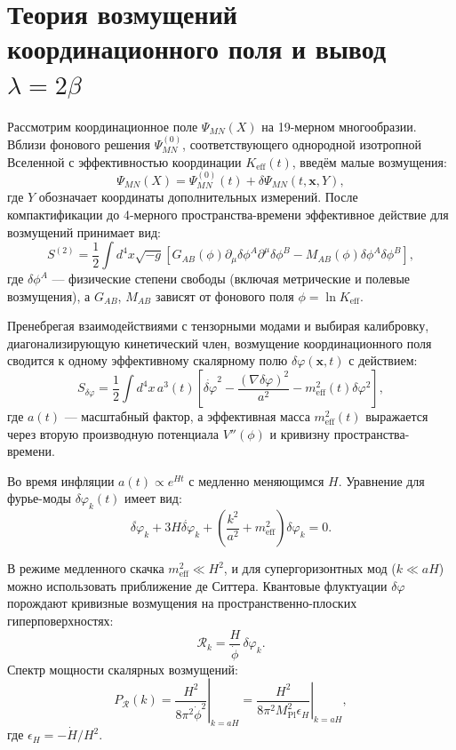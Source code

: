 \documentclass[12pt,a4paper]{article}
\theoremstyle{remark}
\newcommand{\Keff}{K_{\mathrm{eff}}}
\newcommand{\Mpl}{M_{\mathrm{Pl}}}
\begin{document}
	\appendix
	\section{Теория возмущений координационного поля и вывод $\lambda = 2\beta$}
	\label{app:perturbations}
	
	Рассмотрим координационное поле $\Psi_{MN}(X)$ на 19-мерном многообразии. Вблизи фонового решения $\Psi^{(0)}_{MN}$, соответствующего однородной изотропной Вселенной с эффективностью координации $\Keff(t)$, введём малые возмущения:
	\begin{equation}
		\Psi_{MN}(X) = \Psi^{(0)}_{MN}(t) + \delta\Psi_{MN}(t,\mathbf{x},Y),
	\end{equation}
	где $Y$ обозначает координаты дополнительных измерений. После компактификации до 4-мерного пространства-времени эффективное действие для возмущений принимает вид:
	\begin{equation}
		S^{(2)} = \frac{1}{2} \int d^4x \sqrt{-g} \left[ G_{AB}(\phi) \partial_\mu \delta\phi^A \partial^\mu \delta\phi^B - M_{AB}(\phi) \delta\phi^A \delta\phi^B \right],
	\end{equation}
	где $\delta\phi^A$ — физические степени свободы (включая метрические и полевые возмущения), а $G_{AB}$, $M_{AB}$ зависят от фонового поля $\phi = \ln\Keff$.
	
	Пренебрегая взаимодействиями с тензорными модами и выбирая калибровку, диагонализирующую кинетический член, возмущение координационного поля сводится к одному эффективному скалярному полю $\delta\varphi(\mathbf{x},t)$ с действием:
	\begin{equation}
		S_{\delta\varphi} = \frac{1}{2} \int d^4x \, a^3(t) \left[ \dot{\delta\varphi}^2 - \frac{(\nabla\delta\varphi)^2}{a^2} - m_{\mathrm{eff}}^2(t) \delta\varphi^2 \right],
	\end{equation}
	где $a(t)$ — масштабный фактор, а эффективная масса $m_{\mathrm{eff}}^2(t)$ выражается через вторую производную потенциала $V''(\phi)$ и кривизну пространства-времени.
	
	Во время инфляции $a(t) \propto e^{Ht}$ с медленно меняющимся $H$. Уравнение для фурье-моды $\delta\varphi_k(t)$ имеет вид:
	\begin{equation}
		\ddot{\delta\varphi}_k + 3H\dot{\delta\varphi}_k + \left( \frac{k^2}{a^2} + m_{\mathrm{eff}}^2 \right) \delta\varphi_k = 0.
	\end{equation}
	
	В режиме медленного скачка $m_{\mathrm{eff}}^2 \ll H^2$, и для супергоризонтных мод ($k \ll aH$) можно использовать приближение де Ситтера. Квантовые флуктуации $\delta\varphi$ порождают кривизные возмущения на пространственно-плоских гиперповерхностях:
	\begin{equation}
		\mathcal{R}_k = \frac{H}{\dot{\phi}} \, \delta\varphi_k.
	\end{equation}
	Спектр мощности скалярных возмущений:
	\begin{equation}
		P_{\mathcal{R}}(k) = \left. \frac{H^2}{8\pi^2 \dot{\phi}^2} \right|_{k=aH} = \left. \frac{H^2}{8\pi^2 \Mpl^2 \epsilon_H} \right|_{k=aH},
	\end{equation}
	где $\epsilon_H = -\dot{H}/H^2$.
	
\end{document}
